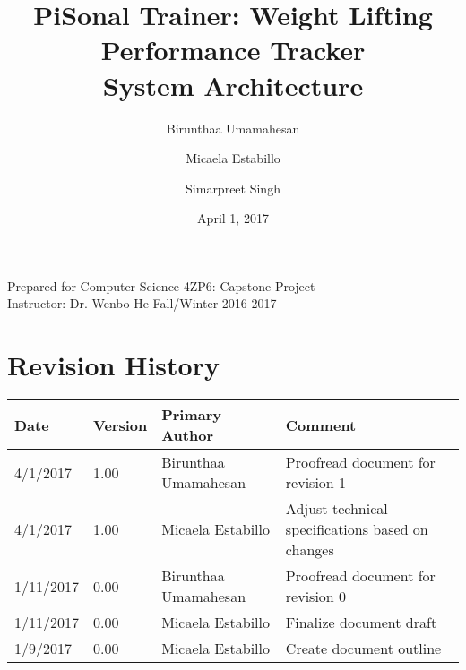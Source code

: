 \documentclass{article}
\title{
PiSonal Trainer: Weight Lifting Performance Tracker\\
\Large {System Architecture}
}
\date{April 1, 2017}
\author{Birunthaa Umamahesan \and Micaela Estabillo \and Simarpreet Singh}
\begin{document}
\thispagestyle{plain}
\maketitle
\vfill
\begin{center}
    Prepared for Computer Science 4ZP6: Capstone Project \\
    Instructor: Dr. Wenbo He
    Fall/Winter 2016-2017\\
\end{center}
\newpage

\tableofcontents

\listoffigures

\listoftables

\thispagestyle{plain}

\newpage

\section*{Revision History}
\begingroup
\begin{tabular}{ | p{2cm} | p{1.5cm} | p{3.8cm} | p{7cm} |} 
    \hline
    \textbf{Date} & \textbf{Version} & \textbf{Primary Author} & \textbf{Comment}\\
    \hline
    4/1/2017 & 1.00 & Birunthaa Umamahesan & Proofread document for revision 1\\ 
    \hline
    4/1/2017 & 1.00 & Micaela Estabillo & Adjust technical specifications based on changes\\ 
    \hline
    1/11/2017 & 0.00 & Birunthaa Umamahesan & Proofread document for revision 0\\
    \hline
    1/11/2017 & 0.00 & Micaela Estabillo & Finalize document draft\\
    \hline
    1/9/2017 & 0.00 & Micaela Estabillo & Create document outline\\
    \hline
\end{tabular}
\endgroup


\begin{center}
\end{center}
\end{document}
